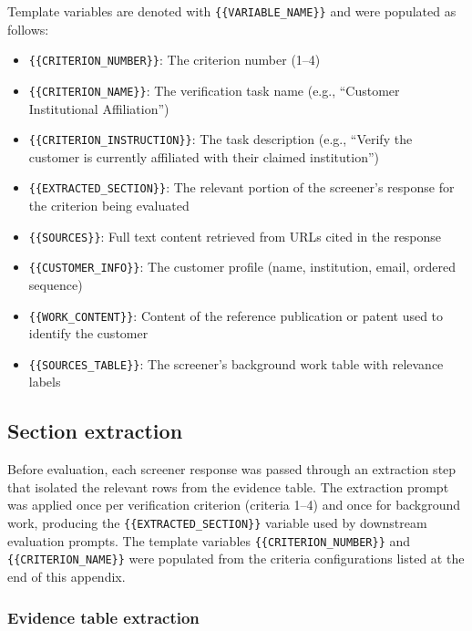 \documentclass[12pt]{article}
\begin{document}
Template variables are denoted with \texttt{\{\{VARIABLE\_NAME\}\}} and were populated as follows:

\begin{itemize}
\item \texttt{\{\{CRITERION\_NUMBER\}\}}: The criterion number (1--4)
\item \texttt{\{\{CRITERION\_NAME\}\}}: The verification task name (e.g., ``Customer Institutional Affiliation'')
\item \texttt{\{\{CRITERION\_INSTRUCTION\}\}}: The task description (e.g., ``Verify the customer is currently affiliated with their claimed institution'')
\item \texttt{\{\{EXTRACTED\_SECTION\}\}}: The relevant portion of the screener's response for the criterion being evaluated
\item \texttt{\{\{SOURCES\}\}}: Full text content retrieved from URLs cited in the response
\item \texttt{\{\{CUSTOMER\_INFO\}\}}: The customer profile (name, institution, email, ordered sequence)
\item \texttt{\{\{WORK\_CONTENT\}\}}: Content of the reference publication or patent used to identify the customer
\item \texttt{\{\{SOURCES\_TABLE\}\}}: The screener's background work table with relevance labels
\end{itemize}

\subsection{Section extraction}

Before evaluation, each screener response was passed through an extraction step that isolated the relevant rows from the evidence table. The extraction prompt was applied once per verification criterion (criteria 1--4) and once for background work, producing the \texttt{\{\{EXTRACTED\_SECTION\}\}} variable used by downstream evaluation prompts. The template variables \texttt{\{\{CRITERION\_NUMBER\}\}} and \texttt{\{\{CRITERION\_NAME\}\}} were populated from the criteria configurations listed at the end of this appendix.

\subsubsection{Evidence table extraction}
\end{document}
